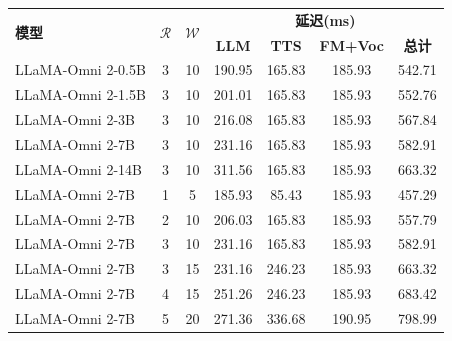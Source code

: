 \begin{table}[!htbp]
    \label{tab:llamaomni2_latency}
    \centering
    \small
    \begin{tabular}{lcccccc}
        \toprule
        \multirow{2}{*}{\textbf{模型}} & \multirow{2}{*}{$\mathcal{R}$} & \multirow{2}{*}{$\mathcal{W}$} & \multicolumn{4}{c}{\textbf{延迟(ms)}} \\
        & & & \textbf{LLM} & \textbf{TTS} & \textbf{FM+Voc} & \textbf{总计} \\
        \midrule
        LLaMA-Omni 2-0.5B & 3 & 10 & 190.95 & 165.83 & 185.93 & 542.71 \\
        LLaMA-Omni 2-1.5B & 3 & 10 & 201.01 & 165.83 & 185.93 & 552.76 \\
        LLaMA-Omni 2-3B & 3 & 10 & 216.08 & 165.83 & 185.93 & 567.84 \\
        LLaMA-Omni 2-7B & 3 & 10 & 231.16 & 165.83 & 185.93 & 582.91 \\
        LLaMA-Omni 2-14B & 3 & 10 & 311.56 & 165.83 & 185.93 & 663.32 \\
        \midrule
        LLaMA-Omni 2-7B & 1 & 5 & 185.93 & 85.43 & 185.93 & 457.29 \\
        LLaMA-Omni 2-7B & 2 & 10 & 206.03 & 165.83 & 185.93 & 557.79 \\
        LLaMA-Omni 2-7B & 3 & 10 & 231.16 & 165.83 & 185.93 & 582.91 \\
        LLaMA-Omni 2-7B & 3 & 15 & 231.16 & 246.23 & 185.93 & 663.32 \\
        LLaMA-Omni 2-7B & 4 & 15 & 251.26 & 246.23 & 185.93 & 683.42 \\
        LLaMA-Omni 2-7B & 5 & 20 & 271.36 & 336.68 & 190.95 & 798.99 \\
        \bottomrule
    \end{tabular}
\end{table}
